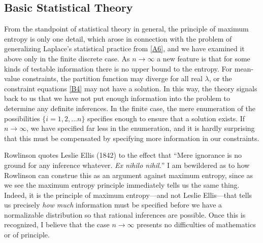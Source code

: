 {\subsection{Basic Statistical Theory}
From the standpoint of statistical theory in general, the principle of maximum entropy is only one detail, which arose in connection with the problem of generalizing Laplace's statistical practice from \eqref{A6}, and we have examined it above only in the finite discrete case.
As $n \to \infty$ a new feature is that for some kinds of testable information there is no upper bound to the entropy.
For mean-value constraints, the partition function may diverge for all real $\lambda$, or the constraint equations \eqref{B4} may not have a solution.
In this way, the theory signals back to us that we have not put enough information into the problem to determine any definite inferences.
In the finite case, the mere enumeration of the possibilities $\{i = 1,2,...n\}$ specifies enough to ensure that a solution exists.
If $n \to \infty$, we have specified far less in the enumeration, and it is hardly surprising that this must be compensated by specifying more information in our constraints.

Rowlinson quotes Leslie Ellis (1842) to the effect that ``Mere ignorance is no ground for any inference whatever. \emph{Ex nihilo nihil.}''
I am bewildered as to how Rowlinson can construe this as an argument against maximum entropy, since as we see the maximum entropy principle immediately tells us the same thing.
Indeed, it is the principle of maximum entropy---and not Leslie Ellis---that tells us precisely \emph{how much} information must be specified before we have a normalizable distribution so that rational inferences are possible.
Once this is recognized, I believe that the case $n \to \infty$ presents no difficulties of mathematics or of principle.

}
